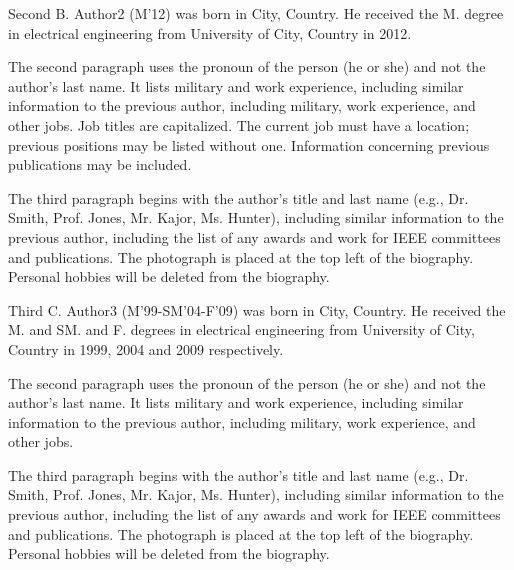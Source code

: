 \documentclass[journal]{IEEEtranTICPS}
\begin{document}
\begin{IEEEbiography}
{Second B. Author2} (M'12) was born in City, Country. He received the M. degree in electrical engineering from University of City, Country in 2012.

The second paragraph uses the pronoun of the person (he or she) and not the author's last name. It lists military and work experience, including similar information to the previous author, including military, work experience, and other jobs. Job titles are capitalized. The current job must have a location; previous positions may be listed without one. Information concerning previous publications may be included.

The third paragraph begins with the author's title and last name (e.g., Dr. Smith, Prof. Jones, Mr. Kajor, Ms. Hunter), including similar information to the previous author, including the list of any awards and work for IEEE committees and publications. The photograph is placed at the top left of the biography. Personal hobbies will be deleted from the 
biography.
\end{IEEEbiography}

\begin{IEEEbiography}
{Third C. Author3} (M'99-SM'04-F'09) was born in City, Country. He received the M. and SM. and F. degrees in electrical engineering from University of City, Country in 1999, 2004 and 2009 respectively.

The second paragraph uses the pronoun of the person (he or she) and not the author's last name. It lists military and work experience, including similar information to the previous author, including military, work experience, and other jobs.

The third paragraph begins with the author's title and last name (e.g., Dr. Smith, Prof. Jones, Mr. Kajor, Ms. Hunter), including similar information to the previous author, including the list of any awards and work for IEEE committees and publications. The photograph is placed at the top left of the biography. Personal hobbies will be deleted from the biography.
\end{IEEEbiography}
\end{document}
